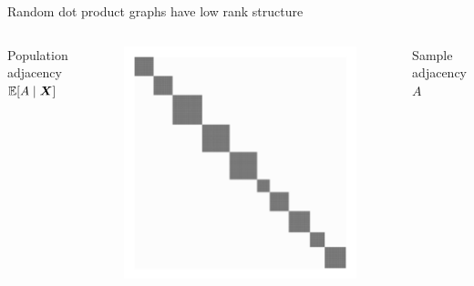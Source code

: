 \documentclass{beamer}
\theoremstyle{remark}
\newcommand{\X}{\bm X}
\DeclarePairedDelimiter{\brac}{[}{]}
\newcommand{\E}[2][]{%
   \ifthenelse{ \equal{#1}{} }
      {\ensuremath{\mathbb{E} \brac*{#2}}}
      {\ensuremath{\mathbb{E} \brac*{#2 \mid #1}}}
}
\begin{document}
\begin{frame}{Random dot product graphs have low rank structure}
    \begin{columns}

        Population adjacency $\E[\X]{A}$

        \begin{figure}
            \includegraphics[width=\textwidth]{figures/presentation/adjacency-population.png}
        \end{figure}


        Sample adjacency $A$


\end{columns}
\end{frame}
\end{document}
